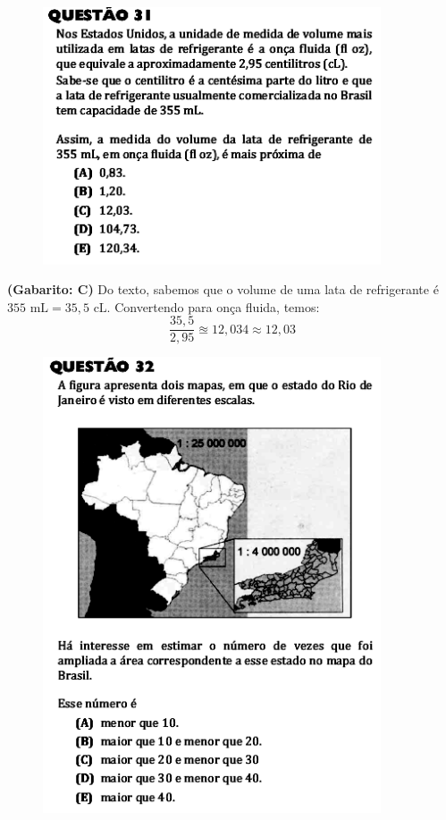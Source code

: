 \documentclass[a4paper]{article}
\begin{document}
\begin{figure}[H]
	\begin{center}
		\includegraphics[width=10cm]{L2Q31.png}
	\end{center}
\end{figure}
\par\textbf{(Gabarito: C)} Do texto, sabemos que o volume de uma lata de refrigerante é $355\text{ mL} = 35,5\text{ cL}$. Convertendo para onça fluida, temos:
\begin{equation*}
\frac{35,5}{2,95} \approxeq 12,034 \approx 12,03
\end{equation*}
\begin{figure}[H]
	\begin{center}
		\includegraphics[width=10cm]{L2Q32.png}
	\end{center}
\end{figure}
\end{document}

